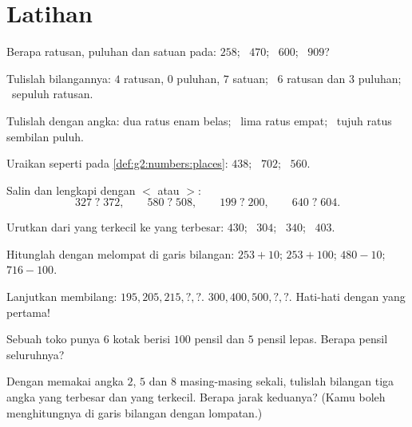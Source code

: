 \section{Latihan}

\begin{exercise}[$\star$]\label{exo:g2:numbers:1}
Berapa ratusan, puluhan dan satuan pada: $258$; \ $470$; \ $600$; \
$909$?
\end{exercise}

\begin{exercise}[$\star$]\label{exo:g2:numbers:2}
Tulislah bilangannya: $4$ ratusan, $0$ puluhan, $7$ satuan; \ $6$
ratusan dan $3$ puluhan; \ sepuluh ratusan.
\end{exercise}

\begin{exercise}[$\star$]\label{exo:g2:numbers:3}
Tulislah dengan angka: dua ratus enam belas; \ lima ratus empat; \
tujuh ratus sembilan puluh.
\end{exercise}

\begin{exercise}[$\star$]\label{exo:g2:numbers:4}
Uraikan seperti pada \cref{def:g2:numbers:places}: $438$; \ $702$; \
$560$.
\end{exercise}

\begin{exercise}[$\star$]\label{exo:g2:numbers:5}
Salin dan lengkapi dengan $<$ atau $>$:
\[
327 \;?\; 372, \qquad
580 \;?\; 508, \qquad
199 \;?\; 200, \qquad
640 \;?\; 604 .
\]
\end{exercise}

\begin{exercise}[$\star$]\label{exo:g2:numbers:6}
Urutkan dari yang terkecil ke yang terbesar: $430$; \ $304$; \ $340$; \ $403$.
\end{exercise}

\begin{exercise}[$\star$]\label{exo:g2:numbers:7}
Hitunglah dengan melompat di garis bilangan: $253 + 10$; \quad
$253 + 100$; \quad $480 - 10$; \quad $716 - 100$.
\end{exercise}

\begin{exercise}[$\star$]\label{exo:g2:numbers:8}
Lanjutkan membilang: $195, 205, 215, ?, ?$. \quad
$300, 400, 500, ?, ?$. \quad Hati-hati dengan yang pertama!
\end{exercise}

\begin{exercise}[$\star$]\label{exo:g2:numbers:9}
Sebuah toko punya $6$ kotak berisi $100$ pensil dan $5$ pensil lepas.
Berapa pensil seluruhnya?
\end{exercise}

\begin{exercise}[$\star\star$]\label{exo:g2:numbers:10}
Dengan memakai angka $2$, $5$ dan $8$ masing-masing sekali, tulislah
bilangan tiga angka yang terbesar dan yang terkecil. Berapa jarak
keduanya? (Kamu boleh menghitungnya di garis bilangan dengan lompatan.)

\end{exercise}
